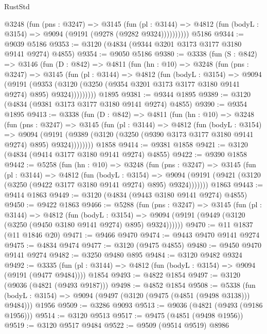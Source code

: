 \begin{lexlean}{RustStd}
\begin{coremodule}
          @3248
            (fun (pns : @3247) =>
            @3145
              (fun (pl : @3144) =>
              @4812 (fun (bodyL : @3154) => @9094 (@9191 (@9278 (@9282 @9324))))))))))
    @5186
@9344 := @9039 @5186
@9353 := @3120 (@4834 (@9344 @3201 @3173 @3177 @3180 @9141 @9274) @4855)
@9354 := @9050 @5186
@9380 := @3338
    (fun (S : @842) =>
    @3146
      (fun (D : @842) =>
      @4811
        (fun (hn : @10) =>
        @3248
          (fun (pns : @3247) =>
          @3145
            (fun (pl : @3144) =>
            @4812
              (fun (bodyL : @3154) =>
              @9094
                (@9191
                  (@9353
                    (@3120 (@3250 (@9354 @3201 @3173 @3177 @3180 @9141 @9274) @895) @9324)))))))))
    @1895
@9381 := @9344 @1895
@9389 := @3120 (@4834 (@9381 @3173 @3177 @3180 @9141 @9274) @4855)
@9390 := @9354 @1895
@9413 := @3338
    (fun (D : @842) =>
    @4811
      (fun (hn : @10) =>
      @3248
        (fun (pns : @3247) =>
        @3145
          (fun (pl : @3144) =>
          @4812
            (fun (bodyL : @3154) =>
            @9094
              (@9191 (@9389 (@3120 (@3250 (@9390 @3173 @3177 @3180 @9141 @9274) @895) @9324))))))))
    @1858
@9414 := @9381 @1858
@9421 := @3120 (@4834 (@9414 @3177 @3180 @9141 @9274) @4855)
@9422 := @9390 @1858
@9442 := @5258
    (fun (hn : @10) =>
    @3248
      (fun (pns : @3247) =>
      @3145
        (fun (pl : @3144) =>
        @4812
          (fun (bodyL : @3154) =>
          @9094 (@9191 (@9421 (@3120 (@3250 (@9422 @3177 @3180 @9141 @9274) @895) @9324)))))))
    @1863
@9443 := @9414 @1863
@9449 := @3120 (@4834 (@9443 @3180 @9141 @9274) @4855)
@9450 := @9422 @1863
@9466 := @5288
    (fun (pns : @3247) =>
    @3145
      (fun (pl : @3144) =>
      @4812
        (fun (bodyL : @3154) =>
        @9094 (@9191 (@9449 (@3120 (@3250 (@9450 @3180 @9141 @9274) @895) @9324))))))
@9470 := @11 @1837 (@11 @1846 @20)
@9471 := @9466 @9470
@9474 := @9443 @9470 @9141 @9274
@9475 := @4834 @9474
@9477 := @3120 (@9475 @4855)
@9480 := @9450 @9470 @9141 @9274
@9482 := @3250 @9480 @895
@9484 := @3120 @9482 @9324
@9492 := @3335
    (fun (pl : @3144) => @4812 (fun (bodyL : @3154) => @9094 (@9191 (@9477 @9484))))
    @1854
@9493 := @4822 @1854
@9497 := @3120 (@9036 (@4821 (@9493 @9187)))
@9498 := @4852 @1854
@9508 := @5338
    (fun (bodyL : @3154) => @9094 (@9497 (@3120 (@9475 (@4851 (@9498 @3138))) @9484)))
    @1956
@9509 := @3286 @9093
@9513 := @9036 (@4821 (@9493 (@9186 @1956)))
@9514 := @3120 @9513
@9517 := @9475 (@4851 (@9498 @1956))
@9519 := @3120 @9517 @9484
@9522 := @9509 (@9514 @9519) @8986

\end{coremodule}
\end{lexlean}
